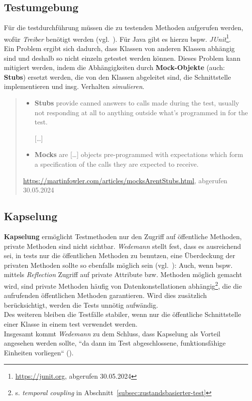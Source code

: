 \subsection*{Testumgebung}
Für die testdurchführung müssen die zu testenden Methoden aufgerufen werden, wofür \textit{Treiber} benötigt werden (vgl.~\cite[55]{Wed09c}).
Für Java gibt es hierzu bspw. \textit{JUnit}\footnote{
\url{https://junit.org}, abgerufen 30.05.2024
}.\\
Ein Problem ergibt sich dadurch, dass Klassen von anderen Klassen abhängig sind und deshalb so nicht einzeln getestet werden können.
Dieses Problem kann mitigiert werden, indem die Abhängigkeiten durch \textbf{Mock-Objekte} (auch: \textbf{Stubs}) ersetzt werden, die von den Klassen abgeleitet sind, die Schnittstelle implementieren und insg. Verhalten \textit{simulieren}.\\

\begin{tcolorbox}[title=Unterschied Mock / Stub]
    \blockquote[{\url{https://martinfowler.com/articles/mocksArentStubs.html}, abgerufen 30.05.2024}]{
        \begin{itemize}
            \item \textbf{Stubs} provide canned answers to calls made during the test, usually not responding at all to anything outside what's programmed in for the test.
            \item[] [\ldots]
            \item \textbf{Mocks} are [\ldots] objects pre-programmed with expectations which form a specification of the calls they are expected to receive.
        \end{itemize}
    }
\end{tcolorbox}

\subsection*{Kapselung}
\textbf{Kapselung} ermöglicht Testmethoden nur den Zugriff auf öffentliche Methoden, private Methoden sind nicht sichtbar.
\textit{Wedemann} stellt fest, dass es ausreichend sei, in tests nur die öffentlichen Methoden zu benutzen, eine Überdeckung der privaten Methoden sollte so ebenfalls möglich sein (vgl.~\cite[56]{Wed09c}): Auch, wenn bspw. mittels \textit{Reflection} Zugriff auf private Attribute bzw. Methoden möglich gemacht wird, sind private Methoden häufig von Datenkonstellationen abhängig\footnote{
s. \textit{temporal coupling} in Abschnitt~\ref{subsec:zustandsbasierter-test}
}, die die aufrufenden öffentlichen Methoden garantieren.
Wird dies zusätzlich berücksichtigt, werden die Tests unnötig aufwändig.\\
Des weiteren bleiben die Testfälle stabiler, wenn nur die öffentliche Schnittstelle einer Klasse in einem test verwendet werden.\\
Insgesamt kommt \textit{Wedemann} zu dem Schluss, dass Kapselung als Vorteil angesehen werden sollte, ``da dann im Test abgeschlossene, funktionsfähige Einheiten vorliegen`` (\cite[56]{Wed09c}).

